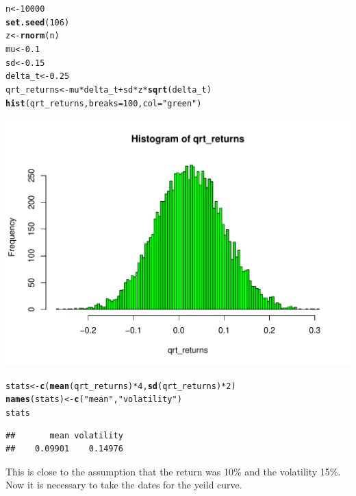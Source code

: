 \documentclass[12pt, a4paper, oneside]{article}\usepackage[]{graphicx}\usepackage[]{color}
\makeatletter
\def\maxwidth{ %
  \ifdim\Gin@nat@width>\linewidth
    \linewidth
  \else
    \Gin@nat@width
  \fi
}
\newcommand{\hlnum}[1]{\textcolor[rgb]{0.686,0.059,0.569}{#1}}%
\newcommand{\hlstr}[1]{\textcolor[rgb]{0.192,0.494,0.8}{#1}}%
\newcommand{\hlopt}[1]{\textcolor[rgb]{0,0,0}{#1}}%
\newcommand{\hlstd}[1]{\textcolor[rgb]{0.345,0.345,0.345}{#1}}%
\newcommand{\hlkwb}[1]{\textcolor[rgb]{0.69,0.353,0.396}{#1}}%
\newcommand{\hlkwc}[1]{\textcolor[rgb]{0.333,0.667,0.333}{#1}}%
\newcommand{\hlkwd}[1]{\textcolor[rgb]{0.737,0.353,0.396}{\textbf{#1}}}%
\newenvironment{kframe}{%
 \def\at@end@of@kframe{}%
 \ifinner\ifhmode%
  \def\at@end@of@kframe{\end{minipage}}%
  \begin{minipage}{\columnwidth}%
 \fi\fi%
 \def\FrameCommand##1{\hskip\@totalleftmargin \hskip-\fboxsep
 \colorbox{shadecolor}{##1}\hskip-\fboxsep
     \hskip-\linewidth \hskip-\@totalleftmargin \hskip\columnwidth}%
 \MakeFramed {\advance\hsize-\width
   \@totalleftmargin\z@ \linewidth\hsize
   \@setminipage}}%
 {\par\unskip\endMakeFramed%
 \at@end@of@kframe}
\newenvironment{knitrout}{}{} %
\makeatother
\begin{document}
\begin{knitrout}
\color{fgcolor}\begin{kframe}
\begin{alltt}
\hlstd{n} \hlkwb{<-} \hlnum{10000}
\hlkwd{set.seed}\hlstd{(}\hlnum{106}\hlstd{)}
\hlstd{z} \hlkwb{<-} \hlkwd{rnorm}\hlstd{(n)}
\hlstd{mu} \hlkwb{<-} \hlnum{0.1}
\hlstd{sd} \hlkwb{<-} \hlnum{0.15}
\hlstd{delta_t} \hlkwb{<-} \hlnum{0.25}
\hlstd{qrt_returns} \hlkwb{<-} \hlstd{mu} \hlopt{*} \hlstd{delta_t} \hlopt{+} \hlstd{sd} \hlopt{*} \hlstd{z} \hlopt{*} \hlkwd{sqrt}\hlstd{(delta_t)}
\hlkwd{hist}\hlstd{(qrt_returns,} \hlkwc{breaks} \hlstd{=} \hlnum{100}\hlstd{,} \hlkwc{col} \hlstd{=} \hlstr{"green"}\hlstd{)}
\end{alltt}
\end{kframe}
\includegraphics[width=\maxwidth]{figure/returns} 
\begin{kframe}\begin{alltt}
\hlstd{stats} \hlkwb{<-} \hlkwd{c}\hlstd{(}\hlkwd{mean}\hlstd{(qrt_returns)} \hlopt{*} \hlnum{4}\hlstd{,} \hlkwd{sd}\hlstd{(qrt_returns)} \hlopt{*} \hlnum{2}\hlstd{)}
\hlkwd{names}\hlstd{(stats)} \hlkwb{<-} \hlkwd{c}\hlstd{(}\hlstr{"mean"}\hlstd{,} \hlstr{"volatility"}\hlstd{)}
\hlstd{stats}
\end{alltt}
\begin{verbatim}
##       mean volatility 
##    0.09901    0.14976
\end{verbatim}
\end{kframe}
\end{knitrout}

This is close to the assumption that the return was 10\% and the volatility 15\%. 
Now it is necessary to take the dates for the yeild curve. 
\end{document}

